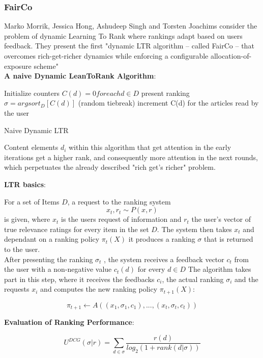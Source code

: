\subsubsection{FairCo}
\label{FairCo}

Marko Morrik, Jessica Hong, Ashudeep Singh and Torsten Joachims consider the problem of dynamic Learning To Rank where rankings adapt based on users feedback. They present the first "dynamic LTR algorithm – called FairCo – that overcomes rich-get-richer dynamics while enforcing a configurable allocation-of-exposure scheme" \cite{MSHJ20}\\
\textbf{A naive Dynamic LeanToRank Algorithm}: \\
\begin{algorithm}[H]
\SetAlgoLined
Initialize counters $C(d)= 0 for each d \in D$\;
{
  	present ranking $\sigma = argsort_D [C(d)]$ (random tiebreak)\;
    increment C(d) for the articles read by the user\;
}

 \caption{Naive Dynamic LTR}
\end{algorithm}

Content elements $d_i$ within this algorithm that get attention in the early iterations get a higher rank, and consequently more attention in the next rounds, which perpetuates the already described "rich get's richer" problem.

\textbf{LTR basics}:

For a set of Items $D$, a request  to the ranking system $$x_t , r_t \sim P(x, r)$$ is given, where $x_t$ is the users request of information and $r_t$ the user's vector of true relevance ratings for every item in the set $D$. The system then takes $x_t$ and dependant on a ranking policy $\pi_t(X)$ it produces a ranking $\sigma$ that is returned to the user. \\
After presenting the ranking $\sigma_t$ , the system receives a feedback vector $c_t$ from the user with a non-negative value $c_t(d)$ for every $d\in D$
The algorithm takes part in this step, where it receives the feedbacks $c_i$, the actual ranking $\sigma_i$ and the requests $x_i$ and computes the new ranking policy $  \pi_{t+1}(X)$:

$$\pi_{t+1} \gets A((x_1, \sigma_1, c_1), ..., (x_t , \sigma_t , c_t ))$$

\textbf{Evaluation of Ranking Performance}:

\[U^{DCG}(\sigma|r) = \sum_{d \in \sigma} \frac{r(d)}{log_2(1+rank(d|\sigma))}\]

